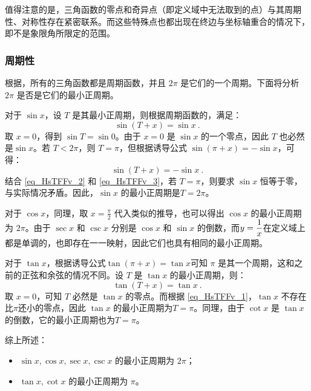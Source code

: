 值得注意的是，三角函数的零点和奇异点（即定义域中无法取到的点）与其周期性、对称性存在紧密联系。而这些特殊点也都出现在终边与坐标轴重合的情况下，即不是象限角所限定的范围。

\subsubsection{周期性}

根据，所有的三角函数都是周期函数，并且 $2\pi$ 是它们的一个周期。下面将分析 $2\pi$ 是否是它们的最小正周期。

对于 $\sin x$，设 $T$ 是其最小正周期，则根据周期函数的，满足：
\begin{equation}\label{eq_HsTFFv_2}
\sin (T+x) = \sin x~.
\end{equation}
取 $x=0$，得到 $\sin T = \sin 0$。由于 $x=0$ 是 $\sin x$ 的一个零点，因此 $T$ 也必然是$\sin x$。若 $T<2\pi$，则 $T=\pi$，但根据诱导公式 $\sin(\pi + x) = -\sin x$，可得：
\begin{equation}\label{eq_HsTFFv_3}
\sin (T + x) = -\sin x~.
\end{equation}
结合 \autoref{eq_HsTFFv_2} 和 \autoref{eq_HsTFFv_3}，若 $T=\pi$，则要求 $\sin x$ 恒等于零，与实际情况矛盾。因此，$\sin x$ 的最小正周期是$T = 2\pi$。

对于 $\cos x$，同理，取 $\displaystyle x=\frac{\pi}{2}$ 代入类似的推导，也可以得出 $\cos x$ 的最小正周期为 $2\pi$。由于 $\sec x$ 和 $\csc x$ 分别是 $\cos x$ 和 $\sin x$ 的倒数，而$\displaystyle y={1\over x}$在定义域上都是单调的，也即存在一一映射，因此它们也具有相同的最小正周期。

对于 $\tan x$，根据诱导公式$\tan (\pi + x) = \tan x$可知 $\pi$ 是其一个周期，这和之前的正弦和余弦的情况不同。设 $T$ 是 $\tan x$ 的最小正周期，则：
\begin{equation}
\tan (T + x) = \tan x~.
\end{equation}
取 $x=0$，可知 $T$ 必然是 $\tan x$ 的零点。而根据 \autoref{eq_HsTFFv_1}，$\tan x$ 不存在比$\pi$还小的零点，因此 $\tan x$ 的最小正周期为$T = \pi$。同理，由于 $\cot x$ 是 $\tan x$ 的倒数，它的最小正周期也为$T = \pi$。

综上所述：
\begin{itemize}
\item $\sin x, \cos x, \sec x, \csc x$ 的最小正周期为 $\displaystyle 2\pi$；
\item $\tan x, \cot x$ 的最小正周期为 $\pi$。
\end{itemize}

